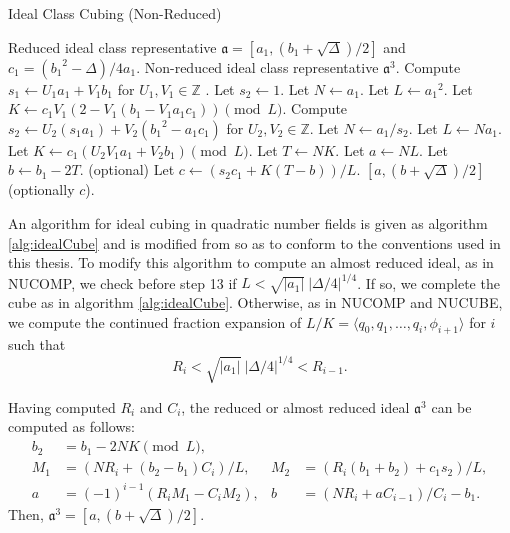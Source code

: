 \documentclass{ucalgthes1}
\theoremstyle{plain}
\theoremstyle{definition}
\newcommand{\ZZ}{\mathbb{Z}}
\begin{document}
\begin{algorithm}[h]
\caption{Ideal Class Cubing (Non-Reduced)}
\label{alg:idealCube}
\begin{algorithmic}[1]
\REQUIRE Reduced ideal class representative $\mathfrak a = \left[a_1, (b_1 + \sqrt\Delta)/2\right]$ and $c_1 = ({b_1}^2-\Delta)/4a_1$.
\ENSURE Non-reduced ideal class representative ${\mathfrak a}^3$.
\STATE Compute $s_1 \leftarrow U_1a_1 + V_1b_1$ for $U_1,V_1 \in \ZZ$ .
	\STATE Let $s_2 \leftarrow 1$.
	\STATE Let $N \leftarrow a_1$.
	\STATE Let $L \leftarrow {a_1}^2$.
	\STATE Let $K \leftarrow c_1V_1(2-V_1(b_1-V_1a_1c_1)) \pmod L$.
\ELSE
	\STATE Compute $s_2 \leftarrow U_2(s_1a_1) + V_2({b_1}^2-a_1c_1)$ for $U_2, V_2 \in \ZZ$.
	\STATE Let $N \leftarrow a_1/s_2$.
	\STATE Let $L \leftarrow Na_1$.
	\STATE Let $K \leftarrow c_1(U_2V_1a_1+V_2b_1) \pmod L$.
\ENDIF
\STATE Let $T \leftarrow NK$.
\STATE Let $a \leftarrow NL$.
\STATE Let $b \leftarrow b_1 - 2T$.
\STATE (optional) Let $c \leftarrow (s_2c_1+K(T-b))/L$.
\RETURN $[a, (b+\sqrt\Delta)/2]$ (optionally $c$).
\end{algorithmic}
\end{algorithm}

An algorithm for ideal cubing in quadratic number fields is given as algorithm \ref{alg:idealCube} and is modified from \cite[Appendix A, Algorithm 5]{Ijs2010} so as to conform to the conventions used in this thesis. To modify this algorithm to compute an almost reduced ideal, as in NUCOMP, we check before step 13 if $L < \sqrt{|a_1|} ~ |\Delta/4|^{1/4}$.  If so, we complete the cube as in algorithm \ref{alg:idealCube}.  Otherwise, as in NUCOMP and NUCUBE, we compute the continued fraction expansion of $L/K = \langle q_0, q_1, \dots, q_i, \phi_{i+1}\rangle$ for $i$ such that
\[
	R_i < \sqrt{|a_1|} ~ |\Delta/4|^{1/4} < R_{i-1}.
\]

\pagebreak\noindent
Having computed $R_i$ and $C_i$, the reduced or almost reduced ideal ${\mathfrak a}^3$ can be computed as follows:
\begin{align*}
	b_2 &= b_1 -2NK \pmod L, & \\
	M_1 &= (NR_i + (b_2-b_1)C_i)/L, &
	M_2 &= (R_i(b_1+b_2)+c_1s_2)/L, \\
	a &= (-1)^{i-1}(R_iM_1-C_iM_2), &
	b &= (NR_i + aC_{i-1})/C_i-b_1.
\end{align*}
Then, $\mathfrak a^3 = [a, (b+\sqrt\Delta)/2]$.
\end{document}
